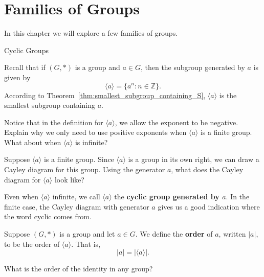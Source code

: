 \chapter{Families of Groups}
\label{chapter:families}
\thispagestyle{empty}

In this chapter we will explore a few families of groups.

\begin{section}{Cyclic Groups}

Recall that if $(G,*)$ is a group and $a\in G$, then the subgroup generated by $a$ is given by
\[
\langle a\rangle =\{a^n:n\in\mathbb{Z}\}.
\]
According to Theorem~\ref{thm:smallest_subgroup_containing_S}, $\langle a\rangle$ is the smallest subgroup containing $a$.  

\begin{exercise}\label{exer:finite_pos_exps}
Notice that in the definition for $\langle a\rangle$, we allow the exponent to be negative.  Explain why we only need to use positive exponents when $\langle a\rangle$ is a finite group.  What about when $\langle a\rangle$ is infinite?
\end{exercise}

\begin{exercise}
Suppose $\langle a\rangle$ is a finite group.  Since $\langle a\rangle$ is a group in its own right, we can draw a Cayley diagram for this group.  Using the generator $a$, what does the Cayley diagram for $\langle a\rangle$ look like?
\end{exercise}

Even when $\langle a\rangle$ infinite, we call $\langle a\rangle$ the \textbf{cyclic group generated by $a$}.  In the finite case, the Cayley diagram with generator $a$ gives us a good indication where the word cyclic comes from.

\begin{definition}
Suppose $(G,*)$ is a group and let $a\in G$.  We define the \textbf{order} of $a$, written $|a|$, to be the order of $\langle a\rangle$.  That is,
\[
|a|=|\langle a\rangle|.
\]
\end{definition}

\begin{exercise}
What is the order of the identity in any group?
\end{exercise}


\end{section}

